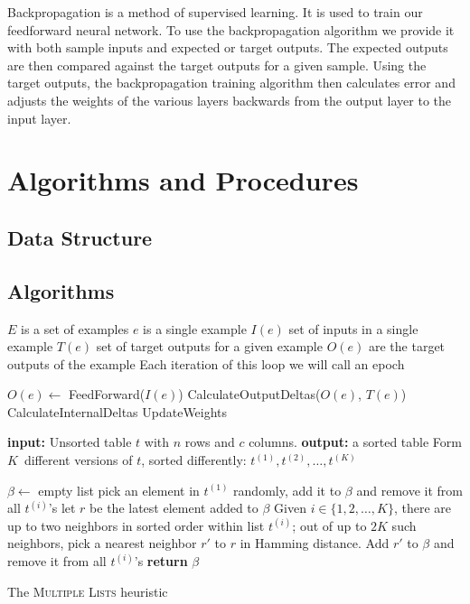 \documentclass[11pt]{article}
\begin{document}

Backpropagation is a method of supervised learning. It is used to train our feedforward neural network. To use the backpropagation
algorithm we provide it with both sample inputs and expected or target outputs. The expected outputs are then compared against the
target outputs for a given sample. Using the target outputs, the backpropagation training algorithm then calculates error and adjusts the weights of the various layers backwards from the output layer to the input layer.




\section{Algorithms and Procedures} %
\label{sec:algorithms_and_procedures}

\subsection{Data Structure} %
\label{sub:data_structure}


\subsection{Algorithms} %
\label{sub:algorithms}

$E$ is a set of examples
$e$ is a single example
$I(e)$ set of inputs in a single example
$T(e)$ set of target outputs for a given example
$O(e)$ are the target outputs of the example
Each iteration of this loop we will call an epoch

\begin{algorithmic}
		\STATE $O(e) \gets$ FeedForward($I(e)$)
		\STATE CalculateOutputDeltas($O(e)$, $T(e)$)
		\STATE CalculateInternalDeltas
		\STATE UpdateWeights
	\ENDFOR
\end{algorithmic}

\begin{algorithm}
{
\begin{algorithmic}[1]
\STATE \textbf{input:}  Unsorted table $t$ with $n$ rows and $c$ columns.
\STATE \textbf{output:} a sorted table
\STATE Form
$K$~different versions of $t$, sorted differently: $t^{(1)},t^{(2)},\dots, t^{(K)}$ 

\STATE $\beta \leftarrow $ empty list
\STATE pick an element in $t^{(1)}$ randomly, add it to $\beta$ and remove it from all $t^{(i)}$'s
\STATE let $r$ be the latest element added to $\beta$
\STATE Given $i\in \{1,2,\dots,K\}$, there are up to two neighbors in sorted order within list $t^{(i)}$; out of up to $2K$ such neighbors, pick a nearest neighbor $r'$ to $r$ in Hamming distance.
\STATE Add $r'$ to $\beta$ and remove it from all $t^{(i)}$'s
\ENDWHILE
\STATE \textbf{return} $\beta$
\end{algorithmic}
}
\caption{\label{algo:multiplelists}The \textsc{Multiple Lists} heuristic}

\end{algorithm}
\end{document}
